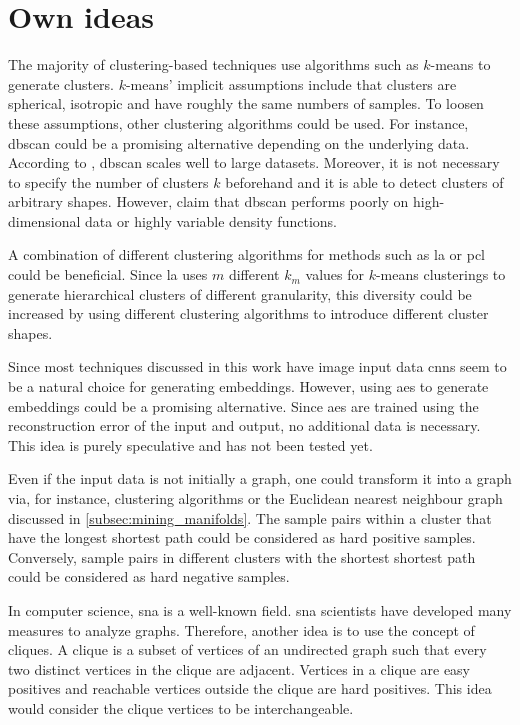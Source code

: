 \section{Own ideas}\label{sec:own_ideas}

The majority of clustering-based techniques use algorithms such as $k$-means to generate clusters.
$k$-means' implicit assumptions include that clusters are spherical, isotropic and have roughly the same numbers of samples. %
To loosen these assumptions, other clustering algorithms could be used.
For instance, \ac{dbscan} could be a promising alternative depending on the underlying data.
According to \citet{local_aggr_2019}, \ac{dbscan} scales well to large datasets.
Moreover, it is not necessary to specify the number of clusters $k$ beforehand and 
it is able to detect clusters of arbitrary shapes.
However, \citeauthor{local_aggr_2019} claim that \ac{dbscan} performs poorly on 
high-dimensional data or highly variable density functions.

A combination of different clustering algorithms for methods such as 
\ac{la} \citet{local_aggr_2019} or \ac{pcl} \citet{PCL_2021} could be beneficial.
Since \ac{la} uses $m$ different $k_m$ values for $k$-means clusterings 
to generate hierarchical clusters of different granularity, 
this diversity could be increased by using different clustering algorithms to introduce different cluster shapes.

Since most techniques discussed in this work have image input data \acp{cnn} seem to be a natural choice for generating embeddings.
However, using \acp{ae} to generate embeddings could be a promising alternative.
Since \acp{ae} are trained using the reconstruction error of the input and output, no additional data is necessary.
This idea is purely speculative and has not been tested yet.

Even if the input data is not initially a graph, one could transform it into a graph via, for instance, 
clustering algorithms or the Euclidean nearest neighbour graph discussed in \autoref{subsec:mining_manifolds}.
The sample pairs within a cluster that have the longest shortest path could be considered as hard positive samples.
Conversely, sample pairs in different clusters with the shortest shortest path could be considered as hard negative samples.

In computer science, \ac{sna} is a well-known field.
\ac{sna} scientists have developed many measures to analyze graphs.
Therefore, another idea is to use the concept of cliques.
A clique is a subset of vertices of an undirected graph such that every two distinct vertices in the clique are adjacent.
Vertices in a clique are easy positives and reachable vertices outside the clique are hard positives.
This idea would consider the clique vertices to be interchangeable.

